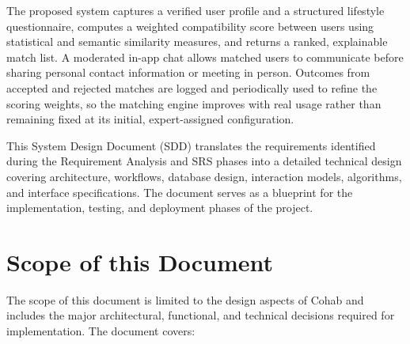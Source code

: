 \documentclass[12pt,a4paper]{report}
\begin{document}
The proposed system captures a verified user profile and a structured lifestyle questionnaire, computes a weighted compatibility score between users using statistical and semantic similarity measures, and returns a ranked, explainable match list. A moderated in-app chat allows matched users to communicate before sharing personal contact information or meeting in person. Outcomes from accepted and rejected matches are logged and periodically used to refine the scoring weights, so the matching engine improves with real usage rather than remaining fixed at its initial, expert-assigned configuration.

This System Design Document (SDD) translates the requirements identified during the Requirement Analysis and SRS phases into a detailed technical design covering architecture, workflows, database design, interaction models, algorithms, and interface specifications. The document serves as a blueprint for the implementation, testing, and deployment phases of the project.

\vspace{10mm}
\section{Scope of this Document}

The scope of this document is limited to the design aspects of Cohab and includes the major architectural, functional, and technical decisions required for implementation. The document covers:
\end{document}
